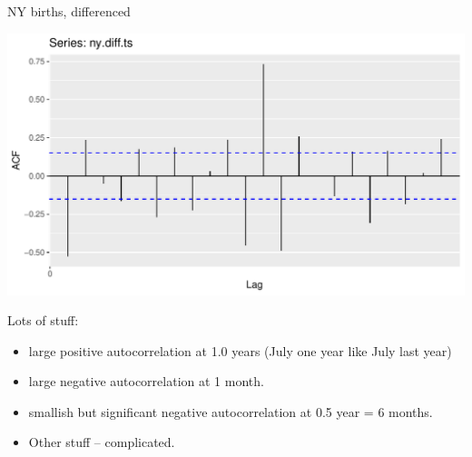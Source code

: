 \documentclass[ignorenonframetext,]{beamer}
\newenvironment{Shaded}{\begin{snugshade}}{\end{snugshade}}
\newcommand{\DataTypeTok}[1]{\textcolor[rgb]{0.13,0.29,0.53}{#1}}
\newcommand{\KeywordTok}[1]{\textcolor[rgb]{0.13,0.29,0.53}{\textbf{#1}}}
\newcommand{\NormalTok}[1]{#1}
\newcommand{\OperatorTok}[1]{\textcolor[rgb]{0.81,0.36,0.00}{\textbf{#1}}}
\newcommand{\StringTok}[1]{\textcolor[rgb]{0.31,0.60,0.02}{#1}}
\providecommand{\tightlist}{%
  \setlength{\itemsep}{0pt}\setlength{\parskip}{0pt}}
\begin{document}
\begin{frame}[fragile]{NY births, differenced}
\protect\hypertarget{ny-births-differenced}{}

\begin{Shaded}
\end{Shaded}

\includegraphics{figure/unnamed-chunk-587-1.pdf}

\end{frame}

\begin{frame}{Lots of stuff:}
\protect\hypertarget{lots-of-stuff}{}

\begin{itemize}
\tightlist
\item
  large positive autocorrelation at 1.0 years (July one year like July
  last year)
\item
  large negative autocorrelation at 1 month.
\item
  smallish but significant negative autocorrelation at 0.5 year = 6
  months.
\item
  Other stuff -- complicated.
\end{itemize}

\end{frame}
\end{document}
